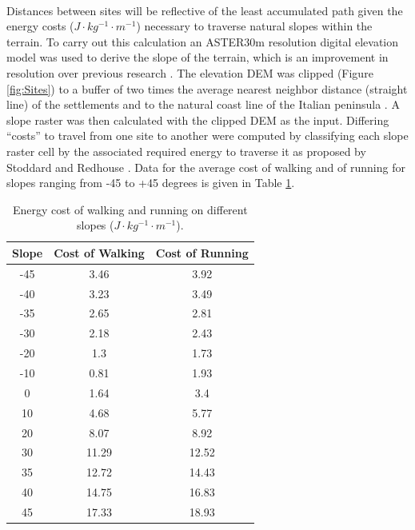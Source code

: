 \documentclass[12pt,a4paper]{thesis}
\begin{document}
\paragraph{}	
Distances between sites will be reflective of the least accumulated path given the energy costs ($J\cdot kg^{-1}\cdot m^{-1}$) necessary to traverse natural slopes within the terrain. To carry out this calculation an ASTER\footnotemark 30m resolution digital elevation model was used to derive the slope of the terrain, which is an improvement in resolution over previous research \citep{StoRed11}. The elevation DEM was clipped (Figure \ref{fig:Sites}) to a buffer of two times the average nearest neighbor distance (straight line) of the settlements and to the natural coast line of the Italian peninsula \citep[167]{StoRed11}. A slope raster was then calculated with the clipped DEM as the input. Differing ``costs'' to travel from one site to another were computed by classifying each slope raster cell by the associated required energy to traverse it as proposed by Stoddard and Redhouse \citeyearpar{StoRed11}. Data for the average cost of walking and of running for slopes ranging from -45 to +45 degrees \citep{Min02} is given in Table \ref{tab:CostData}.   


\begin{table}
\centering
\caption{Energy cost of walking and running on different slopes ($J\cdot kg^{-1}\cdot m^{-1}$).}
\begin{tabular}{|c|c|c|}
\hline Slope & Cost of Walking & Cost of Running \\ 
\hline -45 & 3.46 & 3.92 \\ 
\hline -40 & 3.23 & 3.49 \\ 
\hline -35 & 2.65 & 2.81 \\ 
\hline -30 & 2.18 & 2.43 \\ 
\hline -20 & 1.3 & 1.73 \\ 
\hline -10 & 0.81 & 1.93 \\ 
\hline 0 & 1.64 & 3.4 \\ 
\hline 10 & 4.68 & 5.77 \\ 
\hline 20 & 8.07 & 8.92 \\ 
\hline 30 & 11.29 & 12.52 \\ 
\hline 35 & 12.72 & 14.43 \\ 
\hline 40 & 14.75 & 16.83 \\ 
\hline 45 & 17.33 & 18.93 \\ 
\hline 
\end{tabular} 
\label{tab:CostData}
\end{table}
\end{document}
